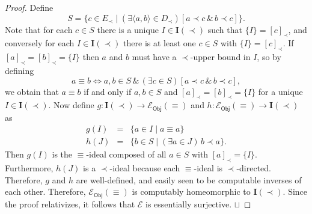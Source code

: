 \documentclass[10pt,a4paper]{amsart}
\def\I#1{{{\mathrm{\mathbf I}}(#1)}}
\newcommand{\Obj}{\mathsf{Obj}}
\def\calE{{\mathcal{E}}}
\def\qed{\ifmmode\squareforqed\else{\unskip\nobreak\hfil
\penalty50\hskip1em\null\nobreak\hfil\squareforqed
\parfillskip=0pt\finalhyphendemerits=0\endgraf}\fi}
\def\squareforqed{\hbox{\rlap{$\sqcap$}$\sqcup$}}
\begin{document}
\begin{proof}
Define
\[S = \{ c\in E_\prec \mid (\exists \langle a,b\rangle\in D_\prec)[a\prec c\,\&\, b\prec c]\}.\]  
Note that for each $c\in S$ there is a unique $I\in\I{\prec}$ such that $\{I\}=[c]_\prec$, and conversely for each $I\in\I{\prec}$ there is at least one $c\in S$ with $\{I\}=[c]_\prec$. If $[a]_\prec = [b]_\prec = \{I\}$ then $a$ and $b$ must have a $\prec$-upper bound in $I$, so by defining
\[a \equiv b \iff a,b\in S \,\&\, (\exists c\in S)[a\prec c\,\&\, b\prec c],\]
we obtain that $a\equiv b$ if and only if $a,b\in S$ and $[a]_\prec = [b]_\prec=\{I\}$ for a unique $I\in\I{\prec}$. Now define $g\colon \I{\prec}\to \calE_\Obj(\equiv)$ and $h\colon \calE_\Obj(\equiv)\to\I{\prec}$ as
\begin{eqnarray*}
g(I) &=& \{ a\in I \mid a \equiv a\}\\
h(J) &=& \{ b\in S\mid (\exists a\in J)\,b\prec a \}.
\end{eqnarray*}
Then $g(I)$ is the $\equiv$-ideal composed of all $a\in S$ with $[a]_\prec = \{I\}$. Furthermore, $h(J)$ is a $\prec$-ideal because each $\equiv$-ideal is $\prec$-directed. Therefore, $g$ and $h$ are well-defined, and easily seen to be computable inverses of each other. Therefore, $\calE_\Obj(\equiv)$ is computably homeomorphic to $\I{\prec}$. Since the proof relativizes, it follows that $\calE$ is essentially surjective.
\qed
\end{proof}
\end{document}
